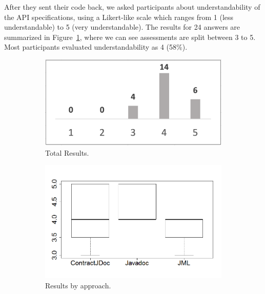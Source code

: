 After they sent their code back, we asked participants about understandability of the API specifications, using a Likert-like scale which ranges from 1 (less understandable) to 5 (very understandable). The results for 24 answers are summarized in Figure~\ref{fig:ExpAnswersTotal}, where we can see assessments are split between 3 to 5. Most participants evaluated understandability as 4 (58\%).

\begin{figure}
\centering
\begin{subfigure}{.32\textwidth}
\includegraphics[width=1\textwidth]{figs/ExpAnswersTotal.png}
\caption{Total Results.}
\label{fig:ExpAnswersTotal}
\end{subfigure}
\begin{subfigure}{.33\textwidth}
\includegraphics[width=1\linewidth]{figs/boxplotApproachesEmpiricalStudy}
\caption{Results by approach.}
\label{fig:approachesEmpirical}
\end{subfigure}
\begin{subfigure}{.33\textwidth}

\end{subfigure}
\end{figure}
